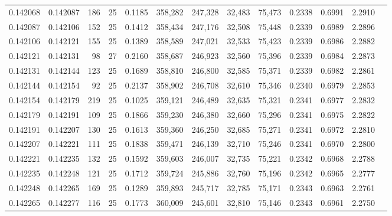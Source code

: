 \begin{tabular}{rrrrrrrrrrrrr}
0.142068 & 0.142087 &   186 &  25 &                                     0.1185 & 358,282 & 247,328 &  32,483 &  75,473 & 0.2338 & 0.6991 & 2.2910 \\
0.142087 & 0.142106 &   152 &  25 &                                     0.1412 & 358,434 & 247,176 &  32,508 &  75,448 & 0.2339 & 0.6989 & 2.2896 \\
0.142106 & 0.142121 &   155 &  25 &                                     0.1389 & 358,589 & 247,021 &  32,533 &  75,423 & 0.2339 & 0.6986 & 2.2882 \\
0.142121 & 0.142131 &    98 &  27 &                                     0.2160 & 358,687 & 246,923 &  32,560 &  75,396 & 0.2339 & 0.6984 & 2.2873 \\
0.142131 & 0.142144 &   123 &  25 &                                     0.1689 & 358,810 & 246,800 &  32,585 &  75,371 & 0.2339 & 0.6982 & 2.2861 \\
0.142144 & 0.142154 &    92 &  25 &                                     0.2137 & 358,902 & 246,708 &  32,610 &  75,346 & 0.2340 & 0.6979 & 2.2853 \\
0.142154 & 0.142179 &   219 &  25 &                                     0.1025 & 359,121 & 246,489 &  32,635 &  75,321 & 0.2341 & 0.6977 & 2.2832 \\
0.142179 & 0.142191 &   109 &  25 &                                     0.1866 & 359,230 & 246,380 &  32,660 &  75,296 & 0.2341 & 0.6975 & 2.2822 \\
0.142191 & 0.142207 &   130 &  25 &                                     0.1613 & 359,360 & 246,250 &  32,685 &  75,271 & 0.2341 & 0.6972 & 2.2810 \\
0.142207 & 0.142221 &   111 &  25 &                                     0.1838 & 359,471 & 246,139 &  32,710 &  75,246 & 0.2341 & 0.6970 & 2.2800 \\
0.142221 & 0.142235 &   132 &  25 &                                     0.1592 & 359,603 & 246,007 &  32,735 &  75,221 & 0.2342 & 0.6968 & 2.2788 \\
0.142235 & 0.142248 &   121 &  25 &                                     0.1712 & 359,724 & 245,886 &  32,760 &  75,196 & 0.2342 & 0.6965 & 2.2777 \\
0.142248 & 0.142265 &   169 &  25 &                                     0.1289 & 359,893 & 245,717 &  32,785 &  75,171 & 0.2343 & 0.6963 & 2.2761 \\
0.142265 & 0.142277 &   116 &  25 &                                     0.1773 & 360,009 & 245,601 &  32,810 &  75,146 & 0.2343 & 0.6961 & 2.2750 \\

\end{tabular}
